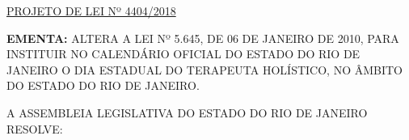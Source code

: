 \documentclass[10pt]{article}
\date{}
\begin{document}
\maketitle
\begin{center}
  \huge
  \vspace{-3cm}\href{http://alerjln1.alerj.rj.gov.br/scpro1519.nsf/f4b46b3cdbba990083256cc900746cf6/a09a888519ff3d1c8325830700521f83?OpenDocument}{PROJETO DE LEI Nº 4404/2018}
\bigskip
\bigskip
\bigskip
  
\end{center}

\textbf{EMENTA:} 
ALTERA A LEI Nº 5.645, DE 06 DE JANEIRO DE 2010, PARA INSTITUIR NO CALENDÁRIO OFICIAL DO ESTADO DO RIO DE JANEIRO O DIA ESTADUAL DO TERAPEUTA HOLÍSTICO, NO ÂMBITO DO ESTADO DO RIO DE JANEIRO.








\bigskip

\noindent
A ASSEMBLEIA LEGISLATIVA DO ESTADO DO RIO DE JANEIRO RESOLVE:
\end{document}
